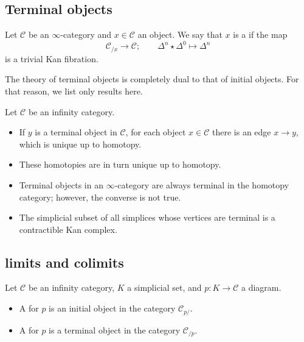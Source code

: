 \documentclass[main.tex]{subfiles}
\begin{document}
\subsection{Terminal objects}
\label{ssc:terminal_objects}

\begin{definition}
  \label{def:terminal_object}
  Let $\mathcal{C}$ be an $\infty$-category and $x \in \mathcal{C}$ an object. We say that $x$ is a  if the map
  \begin{equation*}
    \mathcal{C}_{/x} \to \mathcal{C};\qquad \Delta^{n} \star \Delta^{0} \mapsto \Delta^{n}
  \end{equation*}
  is a trivial Kan fibration.
\end{definition}


The theory of terminal objects is completely dual to that of initial objects. For that reason, we list only results here.

Let $\mathcal{C}$ be an infinity category.
\begin{itemize}
  \item If $y$ is a terminal object in $\mathcal{C}$, for each object $x \in \mathcal{C}$ there is an edge $x \to y$, which is unique up to homotopy.

  \item These homotopies are in turn unique up to homotopy.

  \item Terminal objects in an $\infty$-category are always terminal in the homotopy category; however, the converse is not true.

  \item The simplicial subset of all simplices whose vertices are terminal is a contractible Kan complex.
\end{itemize}

\subsection{limits and colimits}
\label{ssc:limits_and_colimits_in_infty_cats}

\begin{definition}
  \label{def:limit_cone}
  Let $\mathcal{C}$ be an infinity category, $K$ a simplicial set, and $p\colon K \to \mathcal{C}$ a diagram.
  \begin{itemize}
    \item A  for $p$ is an initial object in the category $\mathcal{C}_{p/}$.

    \item A  for $p$ is a terminal object in the category $\mathcal{C}_{/p}$.
  \end{itemize}
\end{definition}
\end{document}
